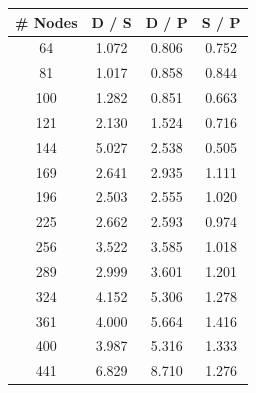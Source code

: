 \documentclass[letterpaper, 10 pt, conference]{ieeeconf}  %
\begin{document}
\begin{figure}
        \begin{minipage}[b]{.45\linewidth}
                \centering
                \begin{center}
                                \begin{tabular}{|c|c|c|c|} \hline
                                \textbf{\# Nodes} & D / S & D / P & S / P \\ \hline
                                64                & 1.072          & 0.806           & 0.752            \\ \hline 
                                81                & 1.017          & 0.858           & 0.844            \\ \hline
                                100               & 1.282          & 0.851           & 0.663            \\ \hline
                                121               & 2.130          & 1.524           & 0.716            \\ \hline
                                144               & 5.027          & 2.538           & 0.505            \\ \hline
                                169               & 2.641          & 2.935           & 1.111            \\ \hline
                                196               & 2.503          & 2.555           & 1.020            \\ \hline
                                225               & 2.662          & 2.593           & 0.974            \\ \hline
                                256               & 3.522          & 3.585           & 1.018            \\ \hline
                                289               & 2.999          & 3.601           & 1.201            \\ \hline
                                324               & 4.152          & 5.306           & 1.278            \\ \hline
                                361               & 4.000          & 5.664           & 1.416            \\ \hline
                                400               & 3.987          & 5.316           & 1.333            \\ \hline
                                441               & 6.829          & 8.710           & 1.276            \\ \hline

\end{tabular}
\end{center}
\end{minipage}
\end{figure}
\end{document}
